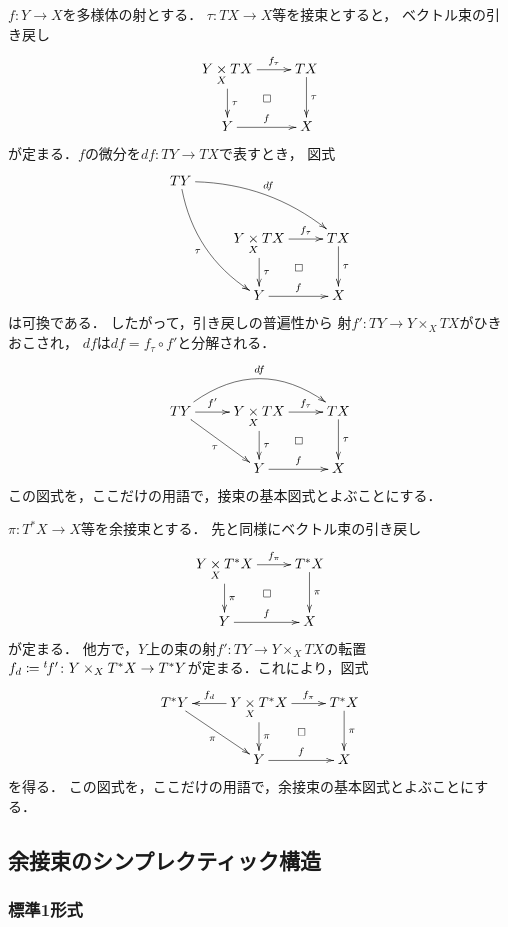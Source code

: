 \(f\colon Y\to X\)を多様体の射とする．
\(\tau\colon TX\to X\)等を接束とすると，
ベクトル束の引き戻し
\[\xymatrix{
  Y\pb[X]TX
  \ar[r]^-{f_{\tau}}
  \ar[d]^-{\tau}
  \ar@{}[dr]|\square
  &
  TX
  \ar[d]^-{\tau}
  \\
  Y\ar[r]^-{f}&X
}\]
が定まる．\(f\)の微分を\(df\colon TY\to TX\)で表すとき，
図式
\[\xymatrix{
  TY
  \ar@/^1pc/[rrd]^-{df}
  \ar@/_1pc/[rdd]_-{\tau}\\
  &Y\pb[X]TX
  \ar[r]^-{f_{\tau}}
  \ar[d]^-{\tau}
  \ar@{}[dr]|\square
  &
  TX
  \ar[d]^-{\tau}
  \\
  &Y\ar[r]^-{f}&X
}\]
は可換である．
したがって，引き戻しの普遍性から
射\(f'\colon TY\to Y\mathbin{\times_{X}}TX\)がひきおこされ，
\(df\)は\(df=f_{\tau}\circ f'\)と分解される．
\[\xymatrix{
  TY
  \ar@/^2pc/[rr]^-{df}
  \ar[r]^-{f'}
  \ar[rd]_-{\tau}
  &Y\pb[X]TX
  \ar[r]^-{f_{\tau}}
  \ar[d]^-{\tau}
  \ar@{}[dr]|\square
  &
  TX
  \ar[d]^-{\tau}
  \\
  &Y\ar[r]^-{f}&X
}\]
この図式を，ここだけの用語で，接束の基本図式とよぶことにする．

\(\pi\colon T^{\ast}X\to X\)等を余接束とする．
先と同様にベクトル束の引き戻し
\[\xymatrix{
  Y\pb[X]T^{\ast}X
  \ar[r]^-{f_{\pi}}
  \ar[d]^-{\pi}
  \ar@{}[dr]|\square
  &
  T^{\ast}X
  \ar[d]^-{\pi}
  \\
  Y\ar[r]^-{f}&X
}\]
が定まる．
他方で，\(Y\)上の束の射\(
  f'\colon TY\to Y\mathbin{\times_{X}}TX
\)の転置\(
  \mdiff[f]\coloneqq {}^{t\!}f'\colon Y\mathbin{\times_{X}}T^{\ast}X\to T^{\ast}Y
\)が定まる．これにより，図式
\begin{equation}\label{diagram:cot}
\vcenter{\xymatrix{
  T^{\ast}Y
  \ar[rd]_-{\pi}
  &
  Y\pb[X]T^{\ast}X
  \ar[l]_-{f_{d}}
  \ar[r]^-{f_{\pi}}
  \ar[d]^-{\pi}
  \ar@{}[dr]|\square
  &
  T^{\ast}X
  \ar[d]^-{\pi}
  \\
  &Y\ar[r]^-{f}&X
}}  
\end{equation}
を得る．
この図式を，ここだけの用語で，余接束の基本図式とよぶことにする．


\subsection{余接束のシンプレクティック構造}

\subsubsection*{標準1形式}

